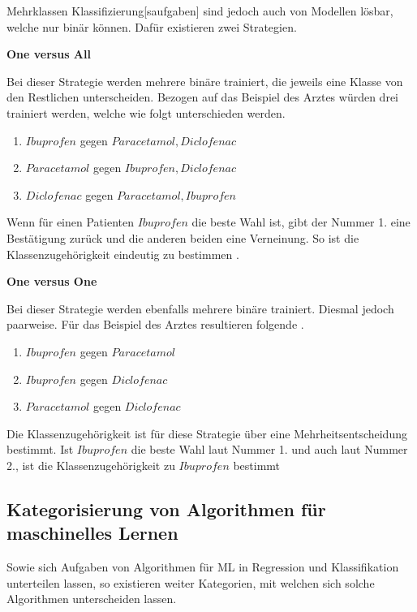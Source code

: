\gls{Mehrklassen Klassifizierung}[saufgaben] sind jedoch auch von Modellen lösbar, welche nur binär  können. Dafür existieren zwei Strategien. \dubpar

\textbf{One versus All}\par
Bei dieser Strategie werden mehrere binäre  trainiert, die jeweils eine Klasse von den Restlichen unterscheiden. Bezogen auf das Beispiel des Arztes würden drei  trainiert werden, welche wie folgt unterschieden werden.

\begin{enumerate}
    \item \(Ibuprofen\) gegen \(Paracetamol, Diclofenac\)
    \item \(Paracetamol\) gegen \(Ibuprofen, Diclofenac\)
    \item \(Diclofenac\) gegen \(Paracetamol, Ibuprofen\)
\end{enumerate}

Wenn für einen Patienten \(Ibuprofen\) die beste Wahl ist, gibt der  Nummer 1. eine Bestätigung zurück und die anderen beiden  eine Verneinung. So ist die Klassenzugehörigkeit eindeutig zu bestimmen \cite{Bishop.2006, ShalevShwartz.2014}. \dubpar

\textbf{One versus One}\par
Bei dieser Strategie werden ebenfalls mehrere binäre  trainiert. Diesmal jedoch paarweise. Für das Beispiel des Arztes resultieren folgende .

 \begin{enumerate}
     \item \(Ibuprofen\) gegen \(Paracetamol\)
     \item \(Ibuprofen\) gegen \(Diclofenac\)
     \item \(Paracetamol\) gegen \(Diclofenac\)
 \end{enumerate}

 Die Klassenzugehörigkeit ist für diese Strategie über eine Mehrheitsentscheidung bestimmt. Ist \(Ibuprofen\) die beste Wahl laut  Nummer 1. und auch laut  Nummer 2., ist die Klassenzugehörigkeit zu \(Ibuprofen\) bestimmt


\subsection{Kategorisierung von Algorithmen für maschinelles Lernen}
Sowie sich Aufgaben von Algorithmen für \gls{ML} in Regression und \gls{Klassifikation} unterteilen lassen, so existieren weiter Kategorien, mit welchen sich solche Algorithmen unterscheiden lassen. \dubpar

